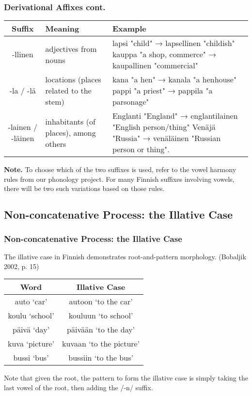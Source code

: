 \documentclass{beamer}
\begin{document}
\begin{frame}
	\frametitle{Derivational Affixes cont.}
    {\scriptsize
    \begin{center}
        \begin{tabular}{|c|p{3cm}|p{5cm}|}
            \hline
            \textbf{Suffix} & \textbf{Meaning} & \textbf{Example}\\\hline
            -llinen &
                adjectives from nouns &
                lapsi "child" → lapsellinen "childish" \newline
                kauppa "a shop, commerce" → kaupallinen "commercial" \\\hline
            -la / -lä &
                locations (places related to the stem) &
                kana "a hen" → kanala "a henhouse" \newline
                pappi "a priest" → pappila "a parsonage" \\\hline
            -lainen / -läinen &
                inhabitants (of places), among others &
                Englanti "England" → englantilainen "English person/thing" \newline
                Venäjä "Russia" → venäläinen "Russian person or thing". \\\hline
        \end{tabular}
    \end{center}
    }
    \textbf{Note.} To choose which of the two suffixes is used, refer to the vowel harmony rules from our phonology project. For many Finnish suffixes involving vowels, there will be two such variations based on those rules.
\end{frame}

\subsection{Non-concatenative Process: the Illative Case}
\begin{frame}
  \frametitle{Non-concatenative Process: the Illative Case}
    The illative case in Finnish demonstrates root-and-pattern morphology. (Bobaljik 2002, p. 15)
    \begin{center}
        \begin{tabular}{ c c }
            \hline\hline
            \textbf{Word} & \textbf{Illative Case}\\\hline\hline
            auto `car' &
                autoon `to the car' \\
            koulu `school' &
                kouluun `to school' \\
            päivä `day' &
                päivään `to the day' \\
            kuva `picture' &
                kuvaan `to the picture' \\
            bussi `bus' &
                bussiin `to the bus' \\\hline
        \end{tabular}
    \end{center}
    Note that given the root, the pattern to form the illative case is simply taking the last vowel of the root, then adding the /-n/ suffix.
\end{frame}
\end{document}
